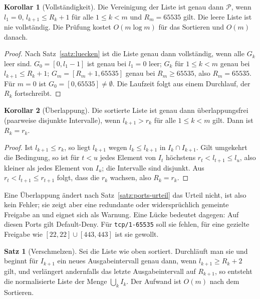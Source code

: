 \documentclass[a4paper,12pt, twoside]{report}
\theoremstyle{definition}
\newtheorem{satz}{Satz}
\newtheorem{korollar}{Korollar}
\begin{document}
\begin{korollar}[Vollständigkeit]
\label{kor:vollstaendig}
	Die Vereinigung der Liste ist genau dann $\mathcal{P}$, wenn $l_1=0$, $l_{k+1}\le R_k+1$ für alle $1\le k<m$ und $R_m=65535$ gilt. Die leere Liste ist nie vollständig. Die Prüfung kostet $O(m\log m)$ für das Sortieren und $O(m)$ danach.
\end{korollar}

\begin{proof}
	Nach Satz~\ref{satz:luecken} ist die Liste genau dann vollständig, wenn alle $G_k$ leer sind. $G_0=[0,l_1-1]$ ist genau bei $l_1=0$ leer; $G_k$ für $1\le k<m$ genau bei $l_{k+1}\le R_k+1$; $G_m=[R_m+1,65535]$ genau bei $R_m\ge65535$, also $R_m=65535$. Für $m=0$ ist $G_0=[0,65535]\ne\emptyset$. Die Laufzeit folgt aus einem Durchlauf, der $R_k$ fortschreibt.
\end{proof}

\begin{korollar}[Überlappung]
\label{kor:ueberlappung}
	Die sortierte Liste ist genau dann überlappungsfrei (paarweise disjunkte Intervalle), wenn $l_{k+1}>r_k$ für alle $1\le k<m$ gilt. Dann ist $R_k=r_k$.
\end{korollar}

\begin{proof}
	Ist $l_{k+1}\le r_k$, so liegt $l_{k+1}$ wegen $l_k\le l_{k+1}$ in $I_k\cap I_{k+1}$. Gilt umgekehrt die Bedingung, so ist für $t<u$ jedes Element von $I_t$ höchstens $r_t<l_{t+1}\le l_u$, also kleiner als jedes Element von $I_u$; die Intervalle sind disjunkt. Aus $r_t<l_{t+1}\le r_{t+1}$ folgt, dass die $r_k$ wachsen, also $R_k=r_k$.
\end{proof}

Eine Überlappung ändert nach Satz~\ref{satz:ports-urteil} das Urteil nicht, ist also kein Fehler; sie zeigt aber eine redundante oder widersprüchlich gemeinte Freigabe an und eignet sich als Warnung. Eine Lücke bedeutet dagegen: Auf diesen Ports gilt Default-Deny. Für \texttt{tcp/1-65535} soll sie fehlen, für eine gezielte Freigabe wie $[22,22]\cup[443,443]$ ist sie gewollt.

\begin{satz}[Verschmelzen]
\label{satz:merge}
	Sei die Liste wie oben sortiert. Durchläuft man sie und beginnt für $I_{k+1}$ ein neues Ausgabeintervall genau dann, wenn $l_{k+1}\ge R_k+2$ gilt, und verlängert andernfalls das letzte Ausgabeintervall auf $R_{k+1}$, so entsteht die normalisierte Liste der Menge $\bigcup_kI_k$. Der Aufwand ist $O(m)$ nach dem Sortieren.
\end{satz}
\end{document}
